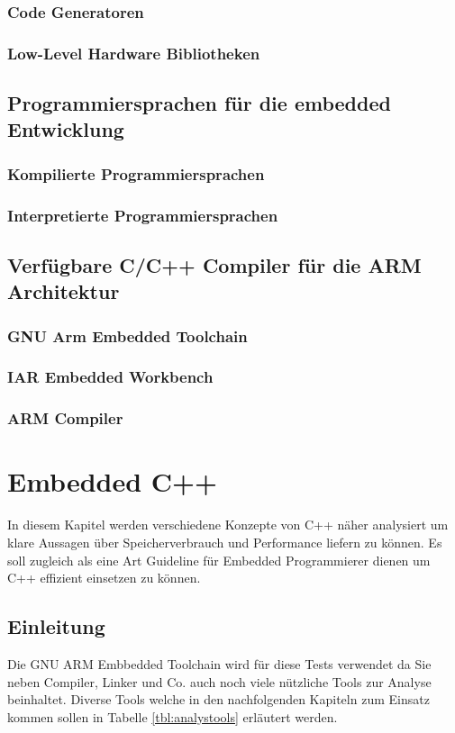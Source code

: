 \documentclass[MES,Master,ngerman]{twbook}%
\begin{document}
\subsection{Code Generatoren}
\subsection{Low-Level Hardware Bibliotheken}
\section{Programmiersprachen für die embedded Entwicklung}
\subsection{Kompilierte Programmiersprachen}
\subsection{Interpretierte Programmiersprachen}
\section{Verfügbare C/C++ Compiler für die ARM Architektur}
\subsection{GNU Arm Embedded Toolchain}
\subsection{IAR Embedded Workbench}
\subsection{ARM Compiler}
\newpage


\chapter{Embedded C++}
In diesem Kapitel werden verschiedene Konzepte von C++ näher analysiert um klare Aussagen über Speicherverbrauch und Performance liefern zu können. Es soll zugleich als eine Art Guideline für Embedded Programmierer dienen um C++ effizient einsetzen zu können. \newline 
\section{Einleitung}


Die GNU ARM Embbedded Toolchain wird für diese Tests verwendet da Sie neben Compiler, Linker und Co. auch noch viele nützliche Tools zur Analyse beinhaltet. Diverse Tools welche in den nachfolgenden Kapiteln zum Einsatz kommen sollen in Tabelle \ref{tbl:analystools} erläutert werden.
\end{document}
